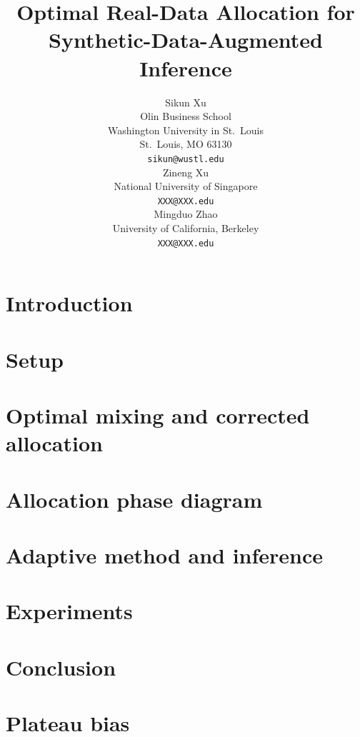 \documentclass{article}
\title{Optimal Real-Data Allocation for\\Synthetic-Data-Augmented Inference}
\author{%
  Sikun Xu \\ Olin Business School \\ Washington University in St.~Louis \\ St.~Louis, MO 63130 \\ \texttt{sikun@wustl.edu} \\
  \And
  Zineng Xu \\ National University of Singapore \\ \texttt{XXX@XXX.edu} \\
  \And
Mingduo Zhao \\ University of California, Berkeley \\ \texttt{XXX@XXX.edu}\\ }
\theoremstyle{plain}
\theoremstyle{definition}
\theoremstyle{remark}
\newcommand{\1}{\mathbf{1}}
\begin{document}
\maketitle

\begin{abstract}
  
\end{abstract}

\section{Introduction}


\section{Setup}


\section{Optimal mixing and corrected allocation}


\section{Allocation phase diagram}


\section{Adaptive method and inference}


\section{Experiments}


\section{Conclusion}





\appendix

\section{Plateau bias}

\end{document}
